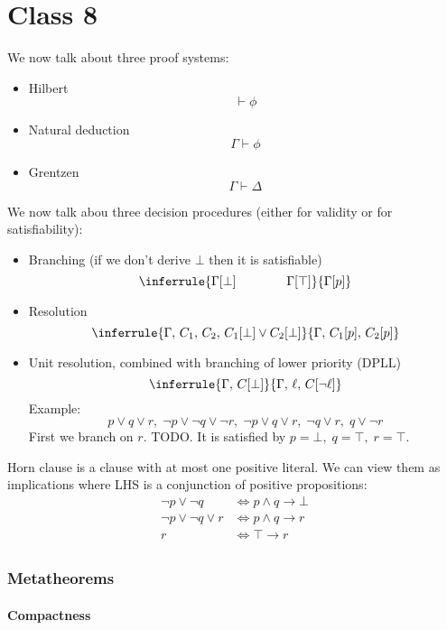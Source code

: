 {{%

\chapter{Class 8}

We now talk about three proof systems:
\begin{itemize}
\item Hilbert $$\vdash \phi$$
\item Natural deduction $$\Gamma \vdash \phi$$
\item Grentzen $$\Gamma \vdash \Delta$$
\end{itemize}
We now talk abou three decision procedures (either for validity or for satisfiability):
\begin{itemize}
\item Branching (if we don't derive $\bot$ then it is satisfiable)
$$\inferrule
{\Gamma[\bot]\qquad\qquad\Gamma[\top]}
{\Gamma[p]}
$$
\item Resolution
$$\inferrule
{\Gamma,\, C_1,\, C_2,\, C_1[\bot] \vee C_2[\bot]}
{\Gamma,\, C_1[p],\, C_2[p]}
$$
\item Unit resolution, combined with branching of lower priority (DPLL)
$$\inferrule
{\Gamma,\, C[\bot]}
{\Gamma,\, \ell,\, C[\neg\ell]}
$$
Example: $$p \vee q \vee r ,\; \neg p \vee \neg q \vee ¬r ,\; \neg p \vee q \vee r ,\; \neg q \vee r ,\; q \vee \neg r$$
First we branch on $r$.
TODO.
It is satisfied by $p=\bot,\; q=\top,\; r=\top$.
\end{itemize}

Horn clause is a clause with at most one positive literal.
We can view them as implications where LHS is a conjunction of positive propositions:
\begin{align*}
\neg p \vee \neg q 
	&\iff p \wedge q \rightarrow \bot \\
\neg p \vee \neg q \vee r 
	&\iff p \wedge q \rightarrow r \\
r 
	&\iff \top \rightarrow r \\
\end{align*}

\subsection{Metatheorems}

\subsubsection{Compactness}

}}
